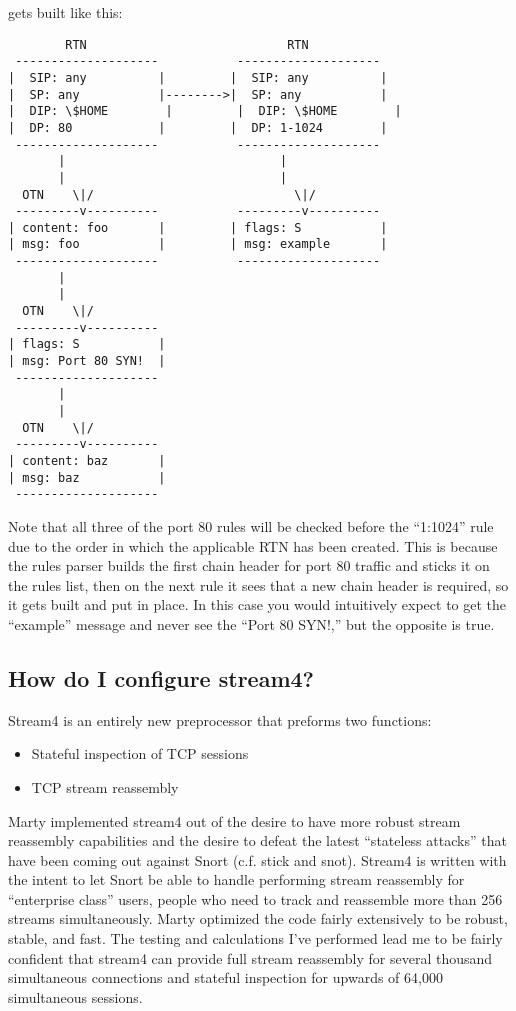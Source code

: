 \documentclass{article}
\begin{document}
gets built like this:

\begin{verbatim}
        RTN                            RTN
 --------------------           --------------------
|  SIP: any          |         |  SIP: any          |
|  SP: any           |-------->|  SP: any           |
|  DIP: \$HOME        |         |  DIP: \$HOME        |
|  DP: 80            |         |  DP: 1-1024        |
 --------------------           --------------------
       |                              |
       |                              |
  OTN    \|/                            \|/
 ---------v----------           ---------v----------  
| content: foo       |         | flags: S           |
| msg: foo           |         | msg: example       |
 --------------------           --------------------
       |
       |
  OTN    \|/  
 ---------v----------
| flags: S           |
| msg: Port 80 SYN!  |
 --------------------
       |
       |
  OTN    \|/  
 ---------v----------
| content: baz       |
| msg: baz           |
 --------------------
\end{verbatim}

Note that all three of the port 80 rules will be checked before the
``1:1024'' rule due to the order in which the applicable RTN has been
created.  This is because the rules parser builds the first chain header
for port 80 traffic and sticks it on the rules list, then on the next
rule it sees that a new chain header is required, so it gets built and
put in place.  In this case you would intuitively expect to get the
``example'' message and never see the ``Port 80 SYN!,'' but the opposite is
true.

\subsection{How do I configure stream4?}
\label{stream4}

Stream4 is an entirely new preprocessor that preforms two functions:

\begin{itemize}
\item Stateful inspection of TCP sessions
\item TCP stream reassembly
\end{itemize}

Marty implemented stream4 out of the desire to have more robust stream reassembly capabilities and the desire to defeat the latest ``stateless attacks'' that have been coming out against Snort (c.f. stick and snot).  Stream4 is written with the intent to let Snort be able to handle performing stream reassembly for ``enterprise class'' users, people who need to track and reassemble more than 256 streams simultaneously.  Marty optimized the code fairly extensively to be robust, stable, and fast.  The testing and calculations I've performed lead me to be fairly confident that stream4 can provide full stream reassembly for several thousand simultaneous connections and stateful inspection for upwards of 64,000 simultaneous sessions.
\end{document}
